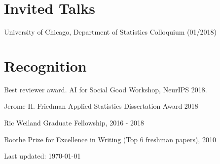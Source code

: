 \documentclass[letterpaper]{article}
\def\footerlink{}
\renewenvironment{itemize}{
  \begin{list}{}{
    \setlength{\leftmargin}{1.5em}
  }
}{
  \end{list}
}
\begin{document}
\section*{Invited Talks}
\begin{itemize}
  \item University of Chicago, Department of Statistics Colloquium (01/2018)
\end{itemize}

\section*{Recognition}
\begin{itemize}
\item Best reviewer award. AI for Social Good Workshop, NeurIPS 2018.
\item Jerome H. Friedman Applied Statistics Dissertation Award 2018
\item Ric Weiland Graduate Fellowship, 2016 - 2018
\item \href{https://undergrad.stanford.edu/programs/pwr/publications-prizes-and-awards/boothe-prize-essays}{Boothe Prize} for Excellence in Writing (Top 6 freshman papers), 2010
\end{itemize}

\begin{center}
  \begin{footnotesize}
    Last updated: \today \\
    \href{\footerlink}{\texttt{\footerlink}}
  \end{footnotesize}
\end{center}
\end{document}
